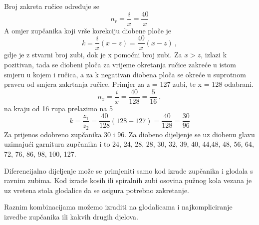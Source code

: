 \documentclass[a4paper,12pt]{article}
\numberwithin{figure}{section}
\begin{document}
Broj zakreta ručice određuje se
\begin{equation}
n_{r} = \frac{i}{x} = \frac{40}{x}
\end{equation}
A omjer zupčanika koji vrše korekciju diobene ploče je
\begin{equation}
k = \frac{i}{x}(x-z) = \frac{40}{x}(x-z)\:,
\end{equation}
gdje je z stvarni broj zubi, dok je x pomoćni broj zubi. Za $x>z$, izlazi k pozitivan, tada se diobeni ploča za vrijeme okretanja ručice zakreće u istom smjeru u kojem i ručica, a za k negativan diobena ploča se okreće u suprotnom pravcu od smjera zakrtanja ručice.
Primjer za z = 127 zubi, te x = 128 odabrani.
\begin{equation}
n_{x} = \frac{i}{x} = \frac{40}{128} = \frac{5}{16}\:,
\end{equation} 
na kraju od 16 rupa prelazimo na 5
\begin{equation}
k = \frac{z_{1}}{z_{2}} = \frac{40}{128} (128-127) = \frac{40}{128} = \frac{30}{96}
\end{equation}
Za prijenos odobreno zupčanika 30 i 96. Za diobeno dijeljenje se uz diobenu glavu uzimajući garnitura zupčanika i to 24, 24, 28, 28, 30, 32, 39, 40, 44,48, 48, 56, 64, 72, 76, 86, 98, 100, 127.\par
Diferencijalno dijeljenje može se primjeniti samo kod izrade zupčanika i glodala s ravnim zubima. Kod izrade kosih ili spiralnih zubi osovina pužnog kola vezana je uz vretena stola glodalice da se osigura potrebno zakretanje.\par
Raznim kombinacijama možemo izraditi na glodalicama i najkompliciranje izvedbe zupčanika ili kakvih drugih djelova.
\end{document}
